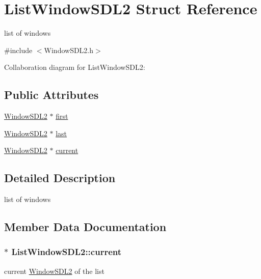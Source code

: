 \hypertarget{structListWindowSDL2}{}\section{List\+Window\+S\+D\+L2 Struct Reference}
\label{structListWindowSDL2}


list of windows  




{\ttfamily \#include $<$Window\+S\+D\+L2.\+h$>$}



Collaboration diagram for List\+Window\+S\+D\+L2\+:
\subsection*{Public Attributes}
\begin{DoxyCompactItemize}
\item 
\hyperlink{structWindowSDL2}{Window\+S\+D\+L2} $\ast$ \hyperlink{structListWindowSDL2_aa97229f3f9f48a602b2a96bfc1bb2bf9}{first}
\item 
\hyperlink{structWindowSDL2}{Window\+S\+D\+L2} $\ast$ \hyperlink{structListWindowSDL2_ae71123501af1a866d08d4eab4b026b41}{last}
\item 
\hyperlink{structWindowSDL2}{Window\+S\+D\+L2} $\ast$ \hyperlink{structListWindowSDL2_a221c8512f5669c9ec3f5450b139a3493}{current}
\end{DoxyCompactItemize}


\subsection{Detailed Description}
list of windows 

\subsection{Member Data Documentation}
\subsubsection[{\texorpdfstring{current}{current}}]{$\ast$ List\+Window\+S\+D\+L2\+::current}\hypertarget{structListWindowSDL2_a221c8512f5669c9ec3f5450b139a3493}{}\label{structListWindowSDL2_a221c8512f5669c9ec3f5450b139a3493}
current \hyperlink{structWindowSDL2}{Window\+S\+D\+L2} of the list 
